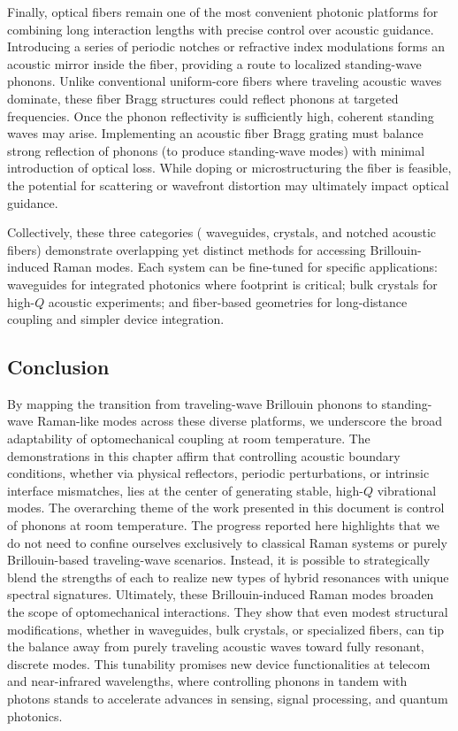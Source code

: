 Finally, optical fibers remain one of the most convenient photonic platforms for combining long interaction lengths with precise control over acoustic guidance. Introducing a series of periodic notches or refractive index modulations forms an acoustic mirror inside the fiber, providing a route to localized standing-wave phonons. Unlike conventional uniform-core fibers where traveling acoustic waves dominate, these fiber Bragg structures could reflect phonons at targeted frequencies. Once the phonon reflectivity is sufficiently high, coherent standing waves may arise. Implementing an acoustic fiber Bragg grating must balance strong reflection of phonons (to produce standing-wave modes) with minimal introduction of optical loss. While doping or microstructuring the fiber is feasible, the potential for scattering or wavefront distortion may ultimately impact optical guidance.

Collectively, these three categories ( waveguides,  crystals, and notched acoustic fibers) demonstrate overlapping yet distinct methods for accessing Brillouin-induced Raman modes. Each system can be fine-tuned for specific applications:  waveguides for integrated photonics where footprint is critical; bulk crystals for high-\(Q\) acoustic experiments; and fiber-based geometries for long-distance coupling and simpler device integration.

\subsection{Conclusion}
\label{subsec:Raman:Conclusion}

By mapping the transition from traveling-wave Brillouin phonons to standing-wave Raman-like modes across these diverse platforms, we underscore the broad adaptability of optomechanical coupling at room temperature. The demonstrations in this chapter affirm that controlling acoustic boundary conditions, whether via physical reflectors, periodic perturbations, or intrinsic interface mismatches, lies at the center of generating stable, high-\(Q\) vibrational modes. The overarching theme of the work presented in this document is control of phonons at room temperature. The progress reported here highlights that we do not need to confine ourselves exclusively to classical Raman systems or purely Brillouin-based traveling-wave scenarios. Instead, it is possible to strategically blend the strengths of each to realize new types of hybrid resonances with unique spectral signatures. Ultimately, these Brillouin-induced Raman modes broaden the scope of optomechanical interactions. They show that even modest structural modifications, whether in waveguides, bulk crystals, or specialized fibers, can tip the balance away from purely traveling acoustic waves toward fully resonant, discrete modes. This tunability promises new device functionalities at telecom and near-infrared wavelengths, where controlling phonons in tandem with photons stands to accelerate advances in sensing, signal processing, and quantum photonics.

\clearpage
\thispagestyle{empty}
\null
\newpage
